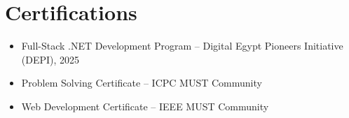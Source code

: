 \section*{Certifications}
\begin{itemize}
    \item Full-Stack .NET Development Program -- Digital Egypt Pioneers
          Initiative (DEPI), 2025
    \item Problem Solving Certificate -- ICPC MUST Community
    \item Web Development Certificate -- IEEE MUST Community
\end{itemize}
